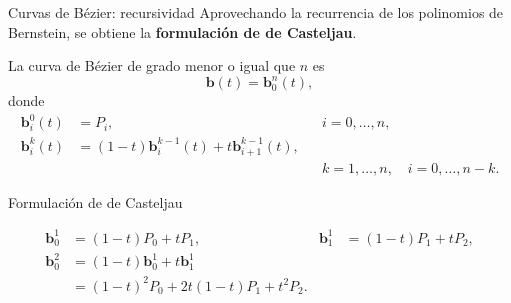 \documentclass[original_version/main.tex]{subfiles}
\begin{document}
\begin{frame}[t]{Curvas de Bézier: recursividad}
Aprovechando la recurrencia de los polinomios de Bernstein, se obtiene la \textbf{formulación de de Casteljau}.\par\medskip La curva de Bézier de grado menor o igual que $n$ es\[\mathbf b(t)=\mathbf b_0^n(t),\]donde\[\begin{aligned}\mathbf b_i^0(t)&=P_i, &&i=0,\ldots,n,\\\mathbf b_i^k(t)&=(1-t)\mathbf b_i^{k-1}(t)+t\mathbf b_{i+1}^{k-1}(t),\\ &&&k=1,\ldots,n,\quad i=0,\ldots,n-k.\end{aligned}\]
\end{frame}

\begin{frame}[t]{Formulación de de Casteljau}
\begin{minipage}[t]{\textwidth}\begin{center}\end{center}\end{minipage}\small\[\begin{aligned}\mathbf b_0^1&=(1-t)P_0+tP_1,&\mathbf b_1^1&=(1-t)P_1+tP_2,\\\mathbf b_0^2&=(1-t)\mathbf b_0^1+t\mathbf b_1^1\\&=(1-t)^2P_0+2t(1-t)P_1+t^2P_2.\end{aligned}\]
\end{frame}
\end{document}
